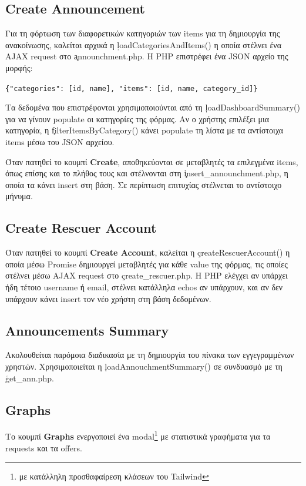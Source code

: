     \subsection{Create Announcement}
        Για τη φόρτωση των διαφορετικών κατηγοριών των items για τη δημιουργία της ανακοίνωσης, καλείται αρχικά η \c{loadCategoriesAndItems()}
        η οποία στέλνει ένα AJAX request στο \c{announchment.php}.
        Η PHP επιστρέφει ένα JSON αρχείο της μορφής:

        \begin{graycomment}
            \verb|{"categories": [id, name], "items": [id, name, category_id]}|
        \end{graycomment}

        Τα δεδομένα που επιστρέφονται χρησιμοποιούνται από τη \c{loadDashboardSummary()} για να γίνουν populate οι κατηγορίες της φόρμας.
        Αν ο χρήστης επιλέξει μια κατηγορία, η \c{filterItemsByCategory()} κάνει populate τη λίστα με τα αντίστοιχα items μέσω του JSON αρχείου.

        Όταν πατηθεί το κουμπί \textbf{Create}, αποθηκεύονται σε μεταβλητές τα επιλεγμένα items, όπως επίσης και το πλήθος τους
        και στέλνονται στη \c{insert\_announchment.php}, η οποία τα κάνει insert στη βάση.
        Σε περίπτωση επιτυχίας στέλνεται το αντίστοιχο μήνυμα.

    \subsection{Create Rescuer Account}
        Όταν πατηθεί το κουμπί \textbf{Create Account}, καλείται η \c{createRescuerAccount()} η οποία μέσω Promise δημιουργεί μεταβλητές για κάθε value της φόρμας,
            τις οποίες στέλνει μέσω AJAX request στο \c{create\_rescuer.php}.
        Η PHP ελέγχει αν υπάρχει ήδη τέτοιο username ή email, στέλνει κατάλληλα echos αν υπάρχουν, και αν δεν υπάρχουν κάνει insert τον νέο χρήστη στη βάση δεδομένων.

    \subsection{Announcements Summary}
        Ακολουθείται παρόμοια διαδικασία με τη δημιουργία του πίνακα των εγγεγραμμένων χρηστών.
        Χρησιμοποιείται η \c{loadAnnouchmentSummary()} σε συνδυασμό με τη \c{get\_ann.php}.

    \subsection{Graphs}
        Το κουμπί \textbf{Graphs} ενεργοποιεί ένα modal\footnote{με κατάλληλη προσθαφαίρεση κλάσεων του Tailwind} με στατιστικά γραφήματα για τα requests και τα offers.
